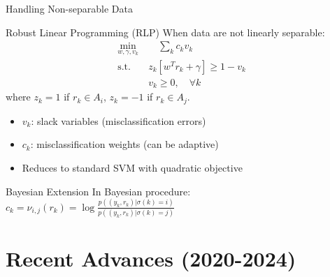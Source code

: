 \documentclass[aspectratio=169]{beamer}
\begin{document}
\begin{frame}{Handling Non-separable Data}
\begin{block}{Robust Linear Programming (RLP)}
When data are not linearly separable:
\begin{align}
\min_{w,\gamma,v_k} &\quad \sum_k c_k v_k \\
\text{s.t.} \quad &z_k[w^T r_k + \gamma] \geq 1 - v_k \\
&v_k \geq 0, \quad \forall k
\end{align}
where $z_k = 1$ if $r_k \in A_i$, $z_k = -1$ if $r_k \in A_j$.
\end{block}

\begin{itemize}
\item $v_k$: slack variables (misclassification errors)
\item $c_k$: misclassification weights (can be adaptive)
\item Reduces to standard SVM with quadratic objective
\end{itemize}

\begin{exampleblock}{Bayesian Extension}
In Bayesian procedure: $c_k = \nu_{i,j}(r_k) = \log\frac{p((y_k,r_k)|\sigma(k)=i)}{p((y_k,r_k)|\sigma(k)=j)}$
\end{exampleblock}
\end{frame}

\section{Recent Advances (2020-2024)}
\end{document}
